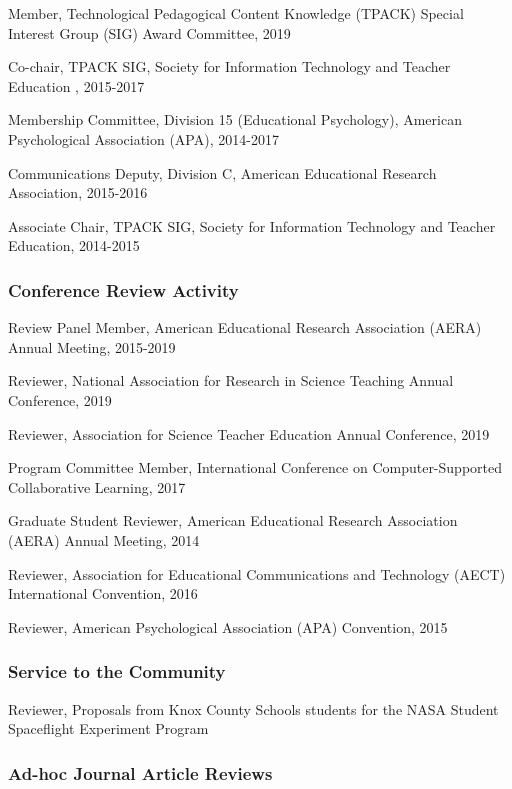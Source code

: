 \documentclass[
  11pt,
]{article}
\begin{document}
Member, Technological Pedagogical Content Knowledge (TPACK) Special
Interest Group (SIG) Award Committee, 2019

Co-chair, TPACK SIG, Society for Information Technology and Teacher
Education , 2015-2017

Membership Committee, Division 15 (Educational Psychology), American
Psychological Association (APA), 2014-2017

Communications Deputy, Division C, American Educational Research
Association, 2015-2016

Associate Chair, TPACK SIG, Society for Information Technology and
Teacher Education, 2014-2015

\hypertarget{conference-review-activity}{%
\subsubsection{Conference Review
Activity}\label{conference-review-activity}}

Review Panel Member, American Educational Research Association (AERA)
Annual Meeting, 2015-2019

Reviewer, National Association for Research in Science Teaching Annual
Conference, 2019

Reviewer, Association for Science Teacher Education Annual Conference,
2019

Program Committee Member, International Conference on Computer-Supported
Collaborative Learning, 2017

Graduate Student Reviewer, American Educational Research Association
(AERA) Annual Meeting, 2014

Reviewer, Association for Educational Communications and Technology
(AECT) International Convention, 2016

Reviewer, American Psychological Association (APA) Convention, 2015

\hypertarget{service-to-the-community}{%
\subsubsection{Service to the
Community}\label{service-to-the-community}}

Reviewer, Proposals from Knox County Schools students for the NASA
Student Spaceflight Experiment Program

\hypertarget{ad-hoc-journal-article-reviews}{%
\subsubsection{Ad-hoc Journal Article
Reviews}\label{ad-hoc-journal-article-reviews}}
\end{document}
